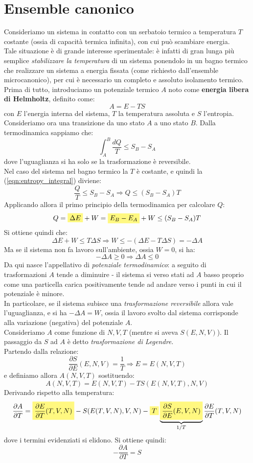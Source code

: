 \documentclass[../MeccanicaStatistica.tex]{subfiles}
\begin{document}
\section{Ensemble canonico}
Consideriamo un sistema in contatto con un serbatoio termico a temperatura $T$ costante (ossia di capacità termica infinita), con cui può scambiare energia.\\
Tale situazione è di grande interesse sperimentale: è infatti di gran lunga più semplice \textit{stabilizzare la temperatura} di un sistema ponendolo in un bagno termico che realizzare un sistema a energia fissata (come richiesto dall'ensemble microcanonico), per cui è necessario un completo e assoluto isolamento termico.\\
Prima di tutto, introduciamo un potenziale termico $A$ noto come \textbf{energia libera di Helmholtz}, definito come:
\[
A=E-TS
\]
con $E$ l'energia interna del sistema, $T$ la temperatura assoluta e $S$ l'entropia.\\
Consideriamo ora una transizione da uno stato $A$ a uno stato $B$. Dalla termodinamica sappiamo che:
\begin{equation}
\int_A^B \frac{dQ}{T}\leq S_B-S_A
\label{eqn:entropy_integral}
\end{equation}
dove l'uguaglianza si ha solo se la trasformazione è reversibile.\\
Nel caso del sistema nel bagno termico la $T$ è costante, e quindi la (\ref{eqn:entropy_integral}) diviene:
\[
\frac{Q}{T}\leq S_B-S_A \Rightarrow Q \leq (S_B-S_A)T
\]
Applicando allora il primo principio della termodinamica per calcolare $Q$:
\[
Q = \hlc{Yellow}{\Delta E} + W= \hlc{Yellow}{E_B-E_A} + W \leq (S_B-S_A)T
\]
Si ottiene quindi che:
\[
\Delta E+W\leq T\Delta S \Rightarrow W \leq -(\Delta E-T\Delta S) = -\Delta A
\]
Ma se il sistema non fa lavoro sull'ambiente, ossia $W=0$, si ha:
\[
-\Delta A \geq 0\Rightarrow \Delta A\leq 0
\]
Da qui nasce l'appellativo di \textit{potenziale termodinamico}: a seguito di trasformazioni  $A$ tende a diminuire - il sistema si  verso stati ad $A$ basso proprio come una particella carica positivamente tende ad andare verso i punti in cui il potenziale è minore.\\
In particolare, se il sistema subisce una \textit{trasformazione reversibile} allora vale l'uguaglianza, e si ha $-\Delta A = W$, ossia il lavoro svolto dal sistema corrisponde alla variazione (negativa) del potenziale $A$.\\
Consideriamo $A$ come funzione di $N,V,T$ (mentre si aveva $S(E,N,V)$). Il passaggio da $S$ ad $A$ è detto \textit{trasformazione di Legendre.}\\
Partendo dalla relazione:
\[
\frac{\partial S}{\partial E}(E,N,V)=\frac{1}{T} \Rightarrow E=E(N,V,T)
\]
e definiamo allora $A(N,V,T)$ sostituendo:
\[
A(N,V,T)=E(N,V,T)-TS(E(N,V,T),N,V)
\]
Derivando rispetto alla temperatura:
\[
\frac{\partial A}{\partial T}=\hlc{Yellow}{\frac{\partial E}{\partial T}(T,V,N)} - S(E(T,V,N), V,N)-\hlc{Yellow}{T}\underbrace{\hlc{Yellow}{\frac{\partial S}{\partial E}(E,V,N)}}_{1/T}\frac{\partial E}{\partial T}(T,V,N)
\]
dove i termini evidenziati si elidono. Si ottiene quindi:
\[
-\frac{\partial A}{\partial T} = S
\]
\end{document}
